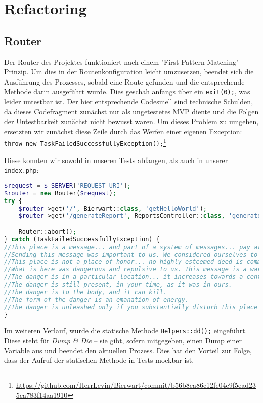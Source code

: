 \documentclass[12pt,a4paper,titlepage,ngerman,pdftex]{report}
\begin{document}
    \section{Refactoring}\label{sec:refactoring}

    \subsection{Router}\label{subsec:router}
    Der Router des Projektes funktioniert nach einem "First Pattern Matching"-Prinzip.
    Um dies in der Routenkonfiguration leicht umzusetzen, beendet sich die Ausführung des Prozesses, sobald eine Route gefunden und die entsprechende Methode darin ausgeführt wurde.
    Dies geschah anfangs über ein \verb|exit(0);|, was leider untestbar ist.
    Der hier entsprechende Codesmell sind \href{https://refactoring.guru/refactoring/technical-debt}{technische Schulden}, da dieses Codefragment zunächst nur als ungetestetes MVP diente und die Folgen der \glqq Untestbarkeit\grqq{} zunächst nicht bewusst waren.
    Um dieses Problem zu umgehen, ersetzten wir zunächst diese Zeile durch das Werfen einer eigenen Exception: \verb|throw new TaskFailedSuccessfullyException();|\footnote{\url{https://github.com/HerrLevin/Bierwart/commit/b56b8ea86c12fe04e9f5ead235ca783f14aa1910}}

    Diese konnten wir sowohl in unseren Tests abfangen, als auch in unserer \verb|index.php|:

    \begin{lstlisting}[language=php,label={lst:lstlisting}]
$request = $_SERVER['REQUEST_URI'];
$router = new Router($request);
try {
    $router->get('/', Bierwart::class, 'getHelloWorld');
    $router->get('/generateReport', ReportsController::class, 'generateReport');

    Router::abort();
} catch (TaskFailedSuccessfullyException) {
//This place is a message... and part of a system of messages... pay attention to it!
//Sending this message was important to us. We considered ourselves to be a powerful culture.
//This place is not a place of honor... no highly esteemed deed is commemorated here... nothing valued is here.
//What is here was dangerous and repulsive to us. This message is a warning about danger.
//The danger is in a particular location... it increases towards a center... the center of danger is here... of a particular size and shape, and below us.
//The danger is still present, in your time, as it was in ours.
//The danger is to the body, and it can kill.
//The form of the danger is an emanation of energy.
//The danger is unleashed only if you substantially disturb this place physically. This place is best shunned and left uninhabited.
}
    \end{lstlisting}
\noindent
    Im weiteren Verlauf, wurde die statische Methode \verb|Helpers::dd();| eingeführt.
    Diese steht für \textit{Dump \& Die} -- sie gibt, sofern mitgegeben, einen Dump einer Variable aus und beendet den aktuellen Prozess.
    Dies hat den Vorteil zur Folge, dass der Aufruf der statischen Methode in Tests mockbar ist.
\end{document}
